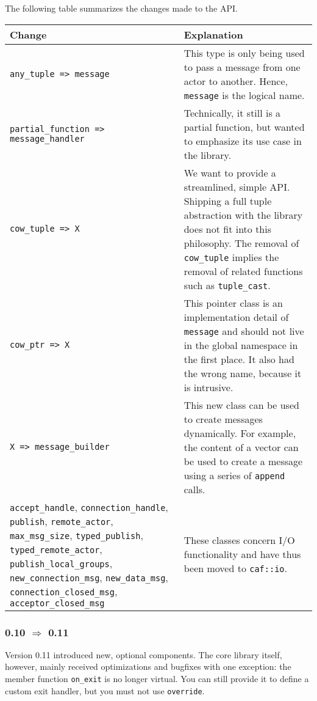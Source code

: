 The following table summarizes the changes made to the API.

\begin{tabular*}{\textwidth}{m{}m{}}
  Change & Explanation \\
  \hline
  \lstinline^any_tuple => message^ & This type is only being used to pass a message from one actor to another. Hence, \lstinline^message^ is the logical name. \\
  \hline
  \lstinline^partial_function => ^ \lstinline^message_handler^ & Technically, it still is a partial function, but wanted to emphasize its use case in the library. \\
  \hline
  \lstinline^cow_tuple => X^ & We want to provide a streamlined, simple API. Shipping a full tuple abstraction with the library does not fit into this philosophy. The removal of \lstinline^cow_tuple^ implies the removal of related functions such as \lstinline^tuple_cast^. \\
  \hline
  \lstinline^cow_ptr => X^ & This pointer class is an implementation detail of \lstinline^message^ and should not live in the global namespace in the first place. It also had the wrong name, because it is intrusive. \\
  \hline
  \lstinline^X => message_builder^ & This new class can be used to create messages dynamically. For example, the content of a vector can be used to create a message using a series of \lstinline^append^ calls. \\
  \hline
  \lstinline^accept_handle^, \lstinline^connection_handle^, \lstinline^publish^, \lstinline^remote_actor^, \lstinline^max_msg_size^, \lstinline^typed_publish^, \lstinline^typed_remote_actor^, \lstinline^publish_local_groups^, \lstinline^new_connection_msg^, \lstinline^new_data_msg^, \lstinline^connection_closed_msg^, \lstinline^acceptor_closed_msg^ & These classes concern I/O functionality and have thus been moved to \lstinline^caf::io^. \\
  \hline
\end{tabular*}

\subsubsection{0.10 $\Rightarrow$ 0.11}

Version 0.11 introduced new, optional components.
The core library itself, however, mainly received optimizations and bugfixes with one exception: the member function \lstinline^on_exit^ is no longer virtual.
You can still provide it to define a custom exit handler, but you must not use \lstinline^override^.

